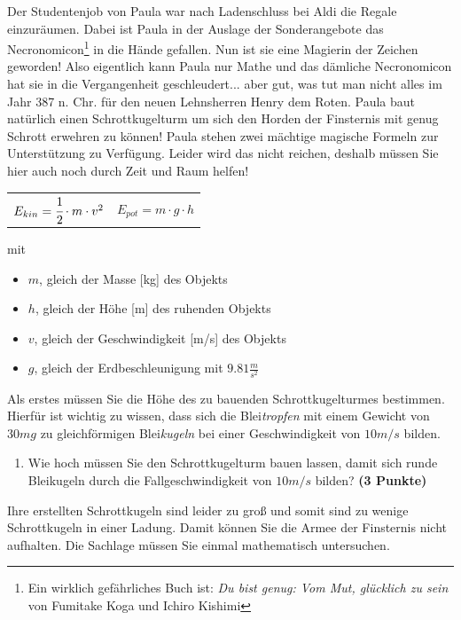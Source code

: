 \documentclass[a4paper, 9pt]{scrartcl}\usepackage[]{graphicx}\usepackage[]{xcolor}
\begin{document}
Der Studentenjob von Paula war nach Ladenschluss bei Aldi die Regale einzuräumen. Dabei ist Paula in der Auslage der Sonderangebote das Necronomicon\footnote{Ein wirklich gefährliches Buch ist: \textit{Du bist genug: Vom Mut, glücklich zu sein} von Fumitake Koga und Ichiro Kishimi} in die Hände gefallen. Nun ist sie eine Magierin der Zeichen geworden! Also eigentlich kann Paula nur Mathe und das dämliche Necronomicon hat sie in die Vergangenheit geschleudert... aber gut, was tut man nicht alles im Jahr 387 n. Chr. für den neuen Lehnsherren Henry dem Roten. Paula baut natürlich einen Schrottkugelturm um sich den
Horden der Finsternis mit genug Schrott erwehren zu können! Paula stehen zwei mächtige magische Formeln zur Unterstützung zu Verfügung. Leider wird das nicht reichen, deshalb müssen Sie hier auch noch durch Zeit und Raum helfen!

\begin{center}
  \begin{tabular}{cc}
    $E_{kin} = \cfrac{1}{2}\cdot m \cdot v^2$ & $E_{pot} = m \cdot g \cdot h$\\
  \end{tabular}
\end{center}

mit

\begin{itemize}[noitemsep]
\item $m$, gleich der Masse [kg] des Objekts
\item $h$, gleich der Höhe [m] des ruhenden Objekts
\item $v$, gleich der Geschwindigkeit [m/s] des Objekts
\item $g$, gleich der Erdbeschleunigung mit $9.81 \tfrac{m}{s^2}$ 
\end{itemize}

Als erstes müssen Sie die Höhe des zu bauenden Schrottkugelturmes bestimmen. Hierfür ist wichtig zu wissen, dass sich die Blei\textit{tropfen} mit einem Gewicht von $30mg$ zu gleichförmigen Blei\textit{kugeln} bei einer Geschwindigkeit von $10m/s$ bilden.

\begin{enumerate}
\item Wie hoch müssen Sie den Schrottkugelturm bauen lassen, damit sich runde Bleikugeln durch die Fallgeschwindigkeit von $10m/s$ bilden? \textbf{(3 Punkte)}
\end{enumerate}

Ihre erstellten Schrottkugeln sind leider zu gro{\ss} und somit sind zu wenige Schrottkugeln in einer Ladung. Damit können Sie die Armee der Finsternis nicht aufhalten. Die Sachlage müssen Sie einmal mathematisch untersuchen.
\end{document}
